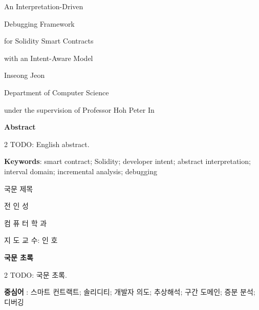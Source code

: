 \documentclass[11pt,oneside]{report}
\theoremstyle{plain}
\theoremstyle{definition}
\theoremstyle{remark}
\begin{document}
{}
\begin{center}
{\LARGE An Interpretation-Driven \par
Debugging Framework \par
for Solidity Smart Contracts \par
with an Intent-Aware Model\par}
\vspace{20pt}
{\normalsize
Inseong Jeon\par
Department of Computer Science\par
under the supervision of Professor Hoh Peter In\par}
\vspace{20pt}
{\large \textbf{Abstract}}
\end{center}

\normalsize
\justifying
\begin{spacing}{2}          %
TODO: English abstract.
\end{spacing}

\vspace{20pt}
\noindent\textbf{Keywords}: smart contract; Solidity; developer intent;
abstract interpretation; interval domain; incremental analysis; debugging

\newpage
\begin{center}
{\LARGE 국문 제목\par}      %
\vspace{20pt}
{\normalsize
전 인 성\par
컴 퓨 터 학 과\par
지 도 교 수: 인 호\par}
\vspace{20pt}
{}
{\large \textbf{국문 초록}}
\end{center}

\normalsize
\justifying
\begin{spacing}{2}
TODO: 국문 초록.
\end{spacing}

\vspace{20pt}
\noindent\textbf{중심어} : 스마트 컨트랙트; 솔리디티; 개발자 의도;
추상해석; 구간 도메인; 증분 분석; 디버깅
\end{document}
